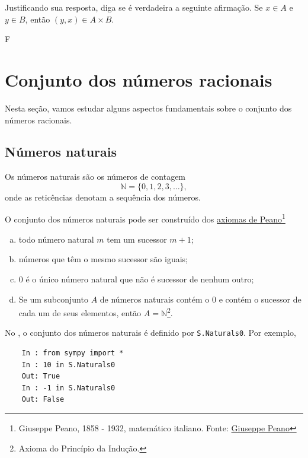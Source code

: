 \begin{exer}
  Justificando sua resposta, diga se é verdadeira a seguinte afirmação. Se $x\in A$ e $y\in B$, então $(y,x)\in A\times B$.
\end{exer}
\begin{resp}
  F
\end{resp}

\section{Conjunto dos números racionais}\label{cap_numreal_sec_racionais}

Nesta seção, vamos estudar alguns aspectos fundamentais sobre o conjunto dos números racionais.

\subsection{Números naturais}

Os números naturais são os números de contagem
\begin{equation}
  \mathbb{N} = \{0, 1, 2, 3, \ldots\},
\end{equation}
onde as reticências denotam a sequência dos números.

O conjunto dos números naturais pode ser construído dos \href{https://pt.wikipedia.org/wiki/Axiomas\_de\_Peano}{axiomas de Peano}\footnote{Giuseppe Peano, 1858 - 1932, matemático italiano. Fonte: \href{https://pt.wikipedia.org/wiki/Giuseppe\_Peano}{Giuseppe Peano}}
\begin{enumerate}[a)]
\item todo número natural $m$ tem um sucessor $m+1$;
\item números que têm o mesmo sucessor são iguais;
\item $0$ é o único número natural que não é sucessor de nenhum outro;
\item Se um subconjunto $A$ de números naturais contém o $0$ e contém o sucessor de cada um de seus elementos, então $A = \mathbb{N}$\footnote{Axioma do Princípio da Indução.}.
\end{enumerate}

\ifispython
\begin{obs}
  No \python, o conjunto dos números naturais é definido por \lstinline!S.Naturals0!. Por exemplo,
  \begin{lstlisting}
    In : from sympy import *
    In : 10 in S.Naturals0
    Out: True
    In : -1 in S.Naturals0
    Out: False
  \end{lstlisting}
\end{obs}
\fi

